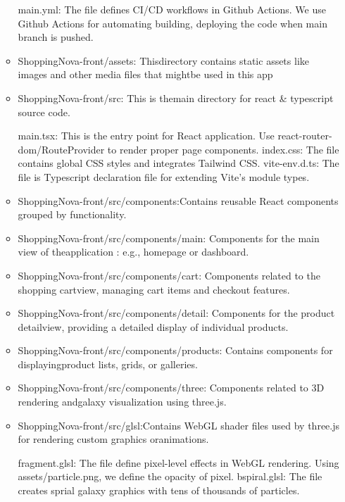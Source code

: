 \documentclass[conference]{IEEEtran}
\begin{document}
\begin{enumerate}
\begin{itemize}
main.yml: The file defines CI/CD workflows in Github Actions. We use Github Actions for automating building, deploying the code when main branch is pushed.

\item ShoppingNova-front/assets: Thisdirectory contains static assets like images and other media files that mightbe used in this app

\item ShoppingNova-front/src: This is themain directory for react \& typescript source code.

main.tsx: This is the entry point for React application. Use react-router-dom/RouteProvider to render proper page components.\newline
index.css: The file contains global CSS styles and integrates Tailwind CSS.\newline
vite-env.d.ts: The file is Typescript declaration file for extending Vite's module types.

\item ShoppingNova-front/src/components:Contains reusable React components grouped by functionality.

\item ShoppingNova-front/src/components/main: Components for the main view of theapplication : e.g., homepage or dashboard.

\item ShoppingNova-front/src/components/cart: Components related to the shopping cartview, managing cart items and checkout features.

\item ShoppingNova-front/src/components/detail: Components for the product detailview, providing a detailed display of individual products.

\item ShoppingNova-front/src/components/products: Contains components for displayingproduct lists, grids, or galleries.

\item ShoppingNova-front/src/components/three: Components related to 3D rendering andgalaxy visualization using three.js.

\item ShoppingNova-front/src/glsl:Contains WebGL shader files used by three.js for rendering custom graphics oranimations.

fragment.glsl: The file define pixel-level effects in WebGL rendering. Using assets/particle.png, we define the opacity of pixel.\newline
bspiral.glsl: The file creates sprial galaxy graphics with tens of thousands of particles.


\end{itemize}
\end{enumerate}
\end{document}
